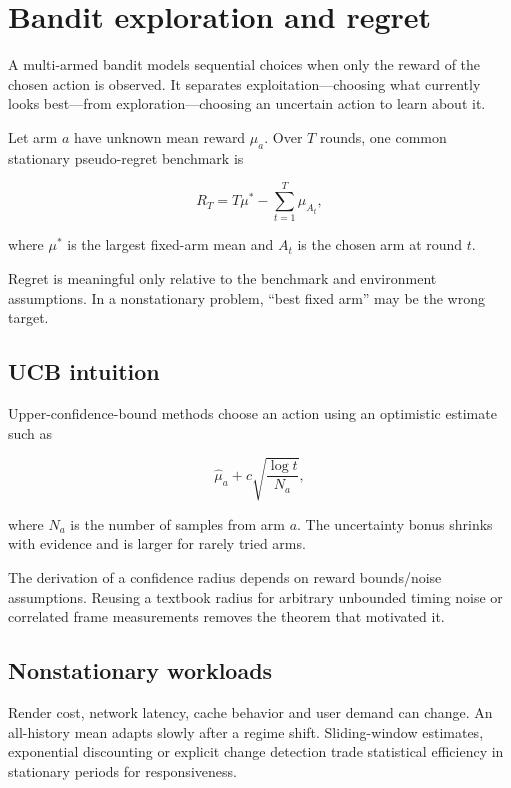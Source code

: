 \hypertarget{appendix-3dc863dbddf3}{}
\section{Bandit exploration and regret}\label{appendix-3dc863dbddf3-bandit-exploration-and-regret}

A multi-armed bandit models sequential choices when only the reward of the chosen action is observed. It separates exploitation---choosing what currently looks best---from exploration---choosing an uncertain action to learn about it.

Let arm \(a\) have unknown mean reward \(\mu_a\). Over \(T\) rounds, one common stationary pseudo-regret benchmark is

\[
R_T=T\mu^*-\sum_{t=1}^{T}\mu_{A_t},
\]

where \(\mu^*\) is the largest fixed-arm mean and \(A_t\) is the chosen arm at round \(t\).

Regret is meaningful only relative to the benchmark and environment assumptions. In a nonstationary problem, ``best fixed arm'' may be the wrong target.

\subsection{UCB intuition}\label{appendix-3dc863dbddf3-ucb-intuition}

Upper-confidence-bound methods choose an action using an optimistic estimate such as

\[
\hat\mu_a+
c\sqrt{\frac{\log t}{N_a}},
\]

where \(N_a\) is the number of samples from arm \(a\). The uncertainty bonus shrinks with evidence and is larger for rarely tried arms.

The derivation of a confidence radius depends on reward bounds/noise assumptions. Reusing a textbook radius for arbitrary unbounded timing noise or correlated frame measurements removes the theorem that motivated it.

\subsection{Nonstationary workloads}\label{appendix-3dc863dbddf3-nonstationary-workloads}

Render cost, network latency, cache behavior and user demand can change. An all-history mean adapts slowly after a regime shift. Sliding-window estimates, exponential discounting or explicit change detection trade statistical efficiency in stationary periods for responsiveness.

